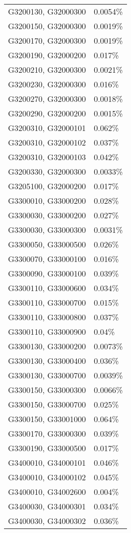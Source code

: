 \begin{longtable}[]{@{}ll@{}}
G3200130, G32000300 & 0.0054\% \\
G3200150, G32000300 & 0.0019\% \\
G3200170, G32000300 & 0.0019\% \\
G3200190, G32000200 & 0.017\% \\
G3200210, G32000300 & 0.0021\% \\
G3200230, G32000300 & 0.016\% \\
G3200270, G32000300 & 0.0018\% \\
G3200290, G32000200 & 0.0015\% \\
G3200310, G32000101 & 0.062\% \\
G3200310, G32000102 & 0.037\% \\
G3200310, G32000103 & 0.042\% \\
G3200330, G32000300 & 0.0033\% \\
G3205100, G32000200 & 0.017\% \\
G3300010, G33000200 & 0.028\% \\
G3300030, G33000200 & 0.027\% \\
G3300030, G33000300 & 0.0031\% \\
G3300050, G33000500 & 0.026\% \\
G3300070, G33000100 & 0.016\% \\
G3300090, G33000100 & 0.039\% \\
G3300110, G33000600 & 0.034\% \\
G3300110, G33000700 & 0.015\% \\
G3300110, G33000800 & 0.037\% \\
G3300110, G33000900 & 0.04\% \\
G3300130, G33000200 & 0.0073\% \\
G3300130, G33000400 & 0.036\% \\
G3300130, G33000700 & 0.0039\% \\
G3300150, G33000300 & 0.0066\% \\
G3300150, G33000700 & 0.025\% \\
G3300150, G33001000 & 0.064\% \\
G3300170, G33000300 & 0.039\% \\
G3300190, G33000500 & 0.017\% \\
G3400010, G34000101 & 0.046\% \\
G3400010, G34000102 & 0.045\% \\
G3400010, G34002600 & 0.004\% \\
G3400030, G34000301 & 0.034\% \\
G3400030, G34000302 & 0.036\% \\

\end{longtable}
